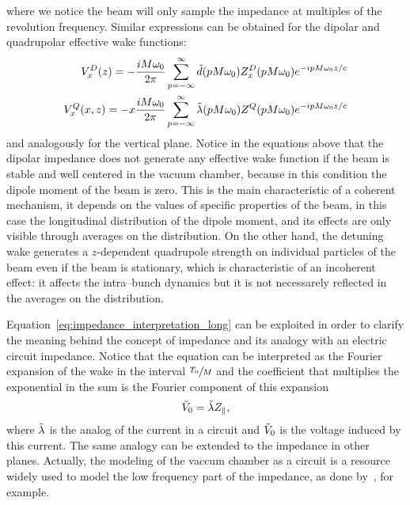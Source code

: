     where we notice the beam will only sample the impedance at multiples of the revolution frequency. Similar expressions can be obtained for the dipolar and quadrupolar effective wake functions:
    \begin{subequations}\label{eq:impedance_interpretation_trans}
    \begin{align}\label{eq:impedance_interpretation_dip}
  		V^D_x(z) = -\frac{iM\omega_0}{2\pi} \sum_{p=-\infty}^\infty \tilde{d}(pM\omega_0)Z^D_x(pM\omega_0)e^{-ipM\omega_0 z/c}\\
        \label{eq:impedance_interpretation_quad}
		V^Q_x(x,z) = -x\frac{iM\omega_0}{2\pi} \sum_{p=-\infty}^\infty \tilde{\lambda}(pM\omega_0)Z^Q(pM\omega_0)e^{-ipM\omega_0 z/c}
    \end{align}
    \end{subequations}
    and analogously for the vertical plane. Notice in the equations above that the dipolar impedance does not generate any effective wake function if the beam is stable and well centered in the vacuum chamber, because in this condition the dipole moment of the beam is zero. This is the main characteristic of a coherent mechanism, it depends on the values of specific properties of the beam, in this case the longitudinal distribution of the dipole moment, and its effects are only visible through averages on the distribution. On the other hand, the detuning wake generates a $z$-dependent quadrupole strength on individual particles of the beam even if the beam is stationary, which is characteristic of an incoherent effect: it affects the intra--bunch dynamics but it is not necessarely reflected in the averages on the distribution.

    Equation~\eqref{eq:impedance_interpretation_long} can be exploited in order to clarify the meaning behind the concept of impedance and its analogy with an electric circuit impedance. Notice that the equation can be interpreted as the Fourier expansion of the wake in the interval $\sfrac{T_0}{M}$ and the coefficient that multiplies the exponential in the sum is the Fourier component of this expansion
    \begin{align}
  	  	\tilde{V}_0 = \tilde{\lambda}Z_\parallel,
    \end{align}
    where $\tilde{\lambda}$ is the analog of the current in a circuit and $\tilde{V}_0$ is the voltage induced by this current. The same analogy can be extended to the impedance in other planes. Actually, the modeling of the vaccum chamber as a circuit is a resource widely used to model the low frequency part of the impedance, as done by~, for example.

